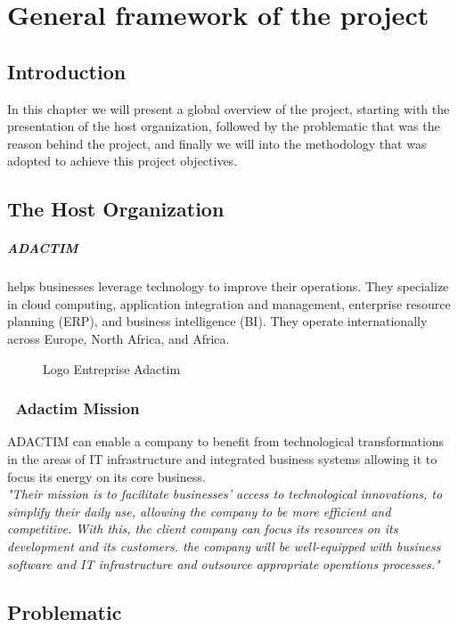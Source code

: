 \chapter{General framework of the project}
\section*{Introduction}
In this chapter we will present a global overview of the project, starting with the presentation of the host organization, followed by the problematic that was the reason behind the project, and finally we will into the methodology that was adopted to achieve this project objectives.
\section{The Host Organization}
\paragraph[short]{ADACTIM}
helps businesses leverage technology to improve their operations. They specialize in cloud computing, application integration and management, enterprise resource planning (ERP), and business intelligence (BI).  They operate internationally across Europe, North Africa, and Africa.

\begin{figure}[htpb]
    \centering
    \caption{Logo Entreprise Adactim}
    \label{fig:logo_Adactim}
\end{figure}

\subsection*{ \textbullet\ Adactim  Mission}
ADACTIM can enable a company to benefit from technological transformations in the areas of IT infrastructure and integrated business systems allowing it to focus its energy on its core business.
\\
\emph{"Their mission is to facilitate businesses' access to technological innovations, to simplify their daily use, allowing the company to be more efficient and competitive.
With this, the client company can focus its resources on its development and its customers. the company will be well-equipped with business software and IT infrastructure and outsource appropriate operations processes."}
\section{Problematic}

